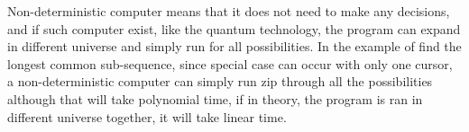 
    Non-deterministic computer means that it does not need to make any decisions, and if such computer exist, like the quantum technology, the program can expand in different universe and simply run for all possibilities. In the example of find the longest common sub-sequence, since special case can occur with only one cursor, a non-deterministic computer can simply run zip through all the possibilities although that will take polynomial time, if in theory, the program is ran in different universe together, it will take linear time.
    
    
    










